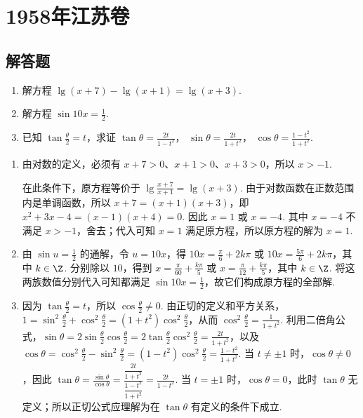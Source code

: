 \chapter{1958年江苏卷}

\section{解答题}

\begin{problem}
\begin{enumerate}
\item
解方程 \(\lg(x+7)-\lg(x+1)=\lg(x+3)\).

\item
解方程 \(\sin 10x=\frac{1}{2}\).

\item
已知 \(\tan\frac{\theta}{2}=t\)，求证
\(\tan\theta=\frac{2t}{1-t^{2}}\)，
\(\sin\theta=\frac{2t}{1+t^{2}}\)，
\(\cos\theta=\frac{1-t^{2}}{1+t^{2}}\).
\end{enumerate}
\end{problem}

\begin{solution}
\begin{enumerate}
\item
由对数的定义，必须有 \(x+7>0\)、\(x+1>0\)、\(x+3>0\)，所以 \(x>-1\).

在此条件下，原方程等价于 \(\lg\frac{x+7}{x+1}=\lg(x+3)\). 由于对数函数在正数范围内是单调函数，所以 \(x+7=(x+1)(x+3)\)，即 \(x^{2}+3x-4=(x-1)(x+4)=0\). 因此 \(x=1\) 或 \(x=-4\). 其中 \(x=-4\) 不满足 \(x>-1\)，舍去；代入可知 \(x=1\) 满足原方程，所以原方程的解为 \(x=1\).

\item
由 \(\sin u=\frac{1}{2}\) 的通解，令 \(u=10x\)，得 \(10x=\frac{\pi}{6}+2k\pi\) 或 \(10x=\frac{5\pi}{6}+2k\pi\)，其中 \(k\in\Z\). 分别除以 \(10\)，得到 \(x=\frac{\pi}{60}+\frac{k\pi}{5}\) 或 \(x=\frac{\pi}{12}+\frac{k\pi}{5}\)，其中 \(k\in\Z\). 将这两族数值分别代入可知都满足 \(\sin 10x=\frac12\)，故它们构成原方程的全部解.

\item
因为 \(\tan\frac{\theta}{2}=t\)，所以 \(\cos\frac{\theta}{2}\ne0\). 由正切的定义和平方关系，\(1=\sin^{2}\frac{\theta}{2}+\cos^{2}\frac{\theta}{2}=\left(1+t^{2}\right)\cos^{2}\frac{\theta}{2}\)，从而 \(\cos^{2}\frac{\theta}{2}=\frac{1}{1+t^{2}}\). 利用二倍角公式，\(\sin\theta=2\sin\frac{\theta}{2}\cos\frac{\theta}{2}=2\tan\frac{\theta}{2}\cos^{2}\frac{\theta}{2}=\frac{2t}{1+t^{2}}\)，以及 \(\cos\theta=\cos^{2}\frac{\theta}{2}-\sin^{2}\frac{\theta}{2}=\left(1-t^{2}\right)\cos^{2}\frac{\theta}{2}=\frac{1-t^{2}}{1+t^{2}}\).
当 \(t\ne\pm1\) 时，\(\cos\theta\ne0\)，因此 \(\tan\theta=\frac{\sin\theta}{\cos\theta}=\frac{\dfrac{2t}{1+t^{2}}}{\dfrac{1-t^{2}}{1+t^{2}}}=\frac{2t}{1-t^{2}}\).
当 \(t=\pm1\) 时，\(\cos\theta=0\)，此时 \(\tan\theta\) 无定义；所以正切公式应理解为在 \(\tan\theta\) 有定义的条件下成立.
\end{enumerate}
\end{solution}


